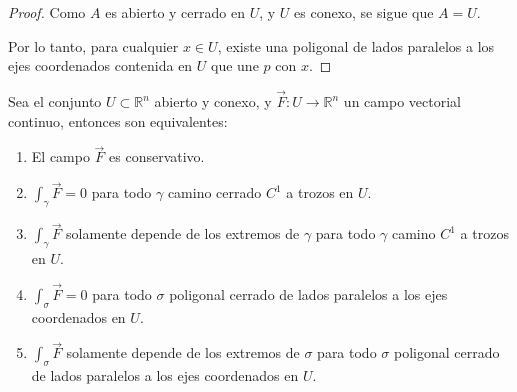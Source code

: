 \begin{proof}
    Como \( A \) es abierto y cerrado en \( U \), y \( U \) es conexo, se sigue que \( A = U \).

    Por lo tanto, para cualquier \( x \in U \), existe una poligonal de lados paralelos a los ejes coordenados contenida en \( U \) que une \( p \) con \( x \).
\end{proof}


\begin{teorema} 
    Sea el conjunto $U \subset \mathbb{R}^n$ abierto y conexo, y $\vec{F}: U \to \mathbb{R}^n$ un campo vectorial continuo, entonces son equivalentes:
    \begin{enumerate}
        \item El campo $\vec{F}$ es conservativo.
        \item $\int_{\gamma} \vec{F} = 0$ para todo $\gamma$ camino cerrado $C^1$ a trozos en $U$.
        \item $\int_{\gamma} \vec{F}$ solamente depende de los extremos de $\gamma$ para todo $\gamma$ camino $C^1$ a trozos en $U$.
        \item $\int_{\sigma} \vec{F} = 0$ para todo $\sigma$ poligonal cerrado de lados paralelos a los ejes coordenados en $U$.
        \item $\int_{\sigma} \vec{F}$ solamente depende de los extremos de $\sigma$ para todo $\sigma$ poligonal cerrado de lados paralelos a los ejes coordenados en $U$.
    \end{enumerate}

\end{teorema}

